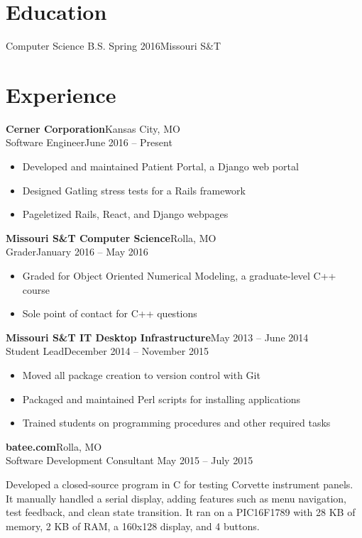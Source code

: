 \documentclass[margin]{res}
\begin{document}
  \begin{resume}
    \section{Education}
      Computer Science B.S. Spring 2016\hfill Missouri S\&T\\
    \section{Experience}
       \textbf{Cerner Corporation}\hfill Kansas City, MO\\
         Software Engineer\hfill June 2016 -- Present
         \begin{itemize} \itemsep -1pt  %
            \item Developed and maintained Patient Portal, a Django web portal
            \item Designed Gatling stress tests for a Rails framework
            \item Pageletized Rails, React, and Django webpages
         \end{itemize}

      \textbf{Missouri S\&T Computer Science}\hfill Rolla, MO\\
         Grader\hfill January 2016 -- May 2016
         \begin{itemize} \itemsep -1pt  %
           \item Graded for Object Oriented Numerical Modeling, a graduate-level C++ course
           \item Sole point of contact for C++ questions
         \end{itemize}

       \textbf{Missouri S\&T IT Desktop Infrastructure}\hfill May 2013 -- June 2014\\
       Student Lead\hfill December 2014 -- November 2015
       \begin{itemize} \itemsep -1pt  %
         \item Moved all package creation to version control with Git
         \item Packaged and maintained Perl scripts for installing applications
         \item Trained students on programming procedures and other required tasks
       \end{itemize}

    \textbf{batee.com}\hfill  Rolla, MO\\
       Software Development Consultant \hfill May 2015 -- July 2015\\
       \vspace{-1em}
       \begin{addmargin}[2.5em]{0em}
         Developed a closed-source program in C for testing Corvette instrument panels.
         It manually handled a serial display, adding features such as menu navigation,
         test feedback, and clean state transition. It ran on a PIC16F1789 with 28 KB of memory,
         2 KB of RAM, a 160x128 display, and 4 buttons.
       \end{addmargin}


\end{resume}
\end{document}
